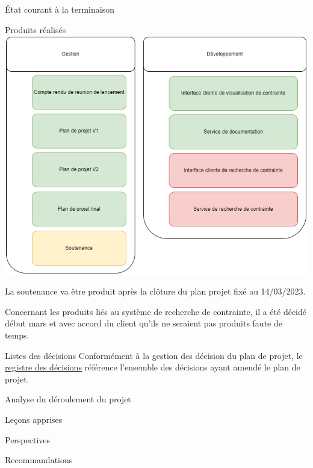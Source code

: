 \documentclass[]{article}
\begin{document}
{\begin{section}{État courant à la terminaison}
\begin{subsection}{Produits réalisés}
     \includegraphics[scale=0.49]{IMG/PBS_final}

     La soutenance va être produit après la clôture du plan projet fixé au 14/03/2023.

     Concernant les produits liés au système de recherche de contrainte, il a été décidé début mars et avec accord du client qu’ils ne seraient pas produits faute de temps.
 \end{subsection}

 \begin{subsection}{Listes des décisions}
     Conformément à la gestion des décision du plan de projet, le \href{Registre_des_décisions.pdf}{registre des décisions} référence l'ensemble des décisions ayant amendé le plan de projet.
 \end{subsection}
\end{section}

\begin{section}{Analyse du déroulement du projet}

\end{section}

\begin{section}{Leçons apprises}

\end{section}

\begin{section}{Perspectives}

\end{section}

\begin{section}{Recommandations}

\end{section}

}
\end{document}
